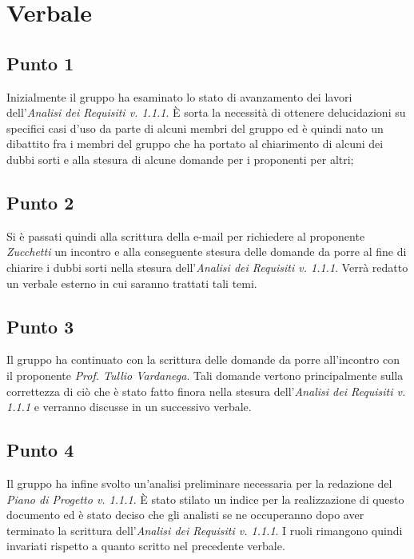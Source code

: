\section{Verbale}
    \subsection{Punto 1}
        Inizialmente il gruppo ha esaminato lo stato di avanzamento dei lavori dell'\textit{Analisi dei Requisiti v. 1.1.1}. È sorta la necessità di ottenere delucidazioni su specifici casi d'uso da parte di alcuni membri del gruppo ed è quindi nato un dibattito fra i membri del gruppo che ha portato al chiarimento di alcuni dei dubbi sorti e alla stesura di alcune domande per i proponenti per altri;
    \subsection{Punto 2}
        Si è passati quindi alla scrittura della e-mail per richiedere al proponente \textit{Zucchetti} un incontro e alla conseguente stesura delle domande da porre al fine di chiarire i dubbi sorti nella stesura dell'\textit{Analisi dei Requisiti v. 1.1.1}. Verrà redatto un verbale esterno in cui saranno trattati tali temi.
    \subsection{Punto 3}
        Il gruppo ha continuato con la scrittura delle domande da porre all'incontro con il proponente \textit{Prof. Tullio Vardanega}. Tali domande vertono principalmente sulla correttezza di ciò che è stato fatto finora nella stesura dell'\textit{Analisi dei Requisiti v. 1.1.1} e verranno discusse in un successivo verbale.
     \subsection{Punto 4}
     	Il gruppo ha infine svolto un'analisi preliminare necessaria per la redazione del \textit{Piano di Progetto v. 1.1.1}. È stato stilato un indice per la realizzazione di questo documento ed è stato deciso che gli analisti se ne occuperanno dopo aver terminato la scrittura dell'\textit{Analisi dei Requisiti v. 1.1.1}.
     	I ruoli rimangono quindi invariati rispetto a quanto scritto nel precedente verbale.